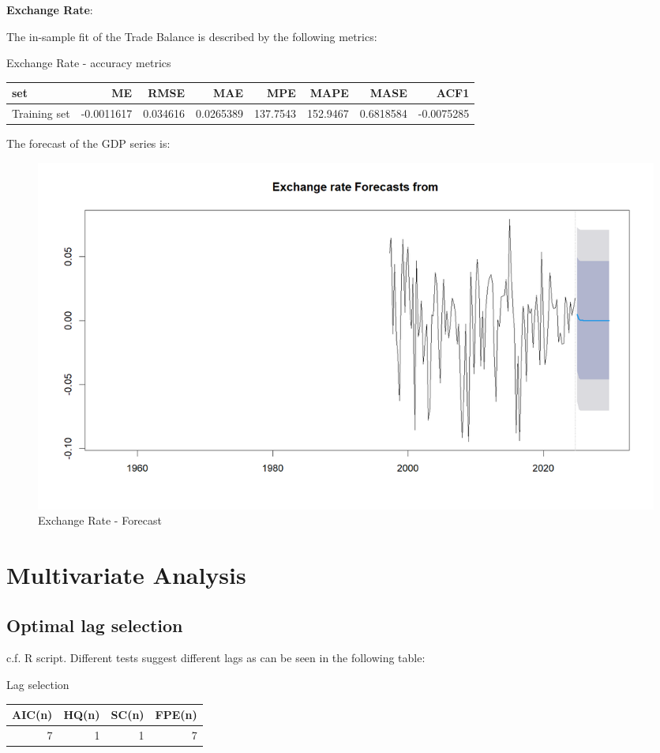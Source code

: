 \documentclass[
]{article}
\begin{document}
\textbf{Exchange Rate}:

The in-sample fit of the Trade Balance is described by the following
metrics:

\bgroup \table[H]
\centering
\caption{\label{tab:unnamed-chunk-19}Exchange Rate - accuracy metrics}
\centering
\begin{tabular}[t]{lrrrrrrr}
\toprule
set & ME & RMSE & MAE & MPE & MAPE & MASE & ACF1\\
\midrule
Training set & -0.0011617 & 0.034616 & 0.0265389 & 137.7543 & 152.9467 & 0.6818584 & -0.0075285\\
\bottomrule
\end{tabular}
\endtable\egroup

The forecast of the GDP series is:

\begin{figure}

{\centering \includegraphics[width=0.8\linewidth]{../results/Exchange Rate_forecast} 

}

\caption{Exchange Rate - Forecast}\label{fig:unnamed-chunk-20}
\end{figure}

\section{Multivariate Analysis}

\subsection{Optimal lag selection}

c.f. R script. Different tests suggest different lags as can be seen in
the following table:

\bgroup \table[H]
\centering
\caption{\label{tab:unnamed-chunk-21}Lag selection}
\centering
\begin{tabular}[t]{rrrr}
\toprule
AIC(n) & HQ(n) & SC(n) & FPE(n)\\
\midrule
7 & 1 & 1 & 7\\
\bottomrule
\end{tabular}
\endtable\egroup
\end{document}
